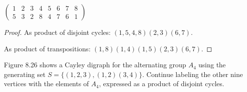 \begin{exercise}
    $\begin{pmatrix}
            1 & 2 & 3 & 4 & 5 & 6 & 7 & 8 \\
            5 & 3 & 2 & 8 & 4 & 7 & 6 & 1
        \end{pmatrix}$
\end{exercise}

\begin{proof}
    As product of disjoint cycles: $(1, 5, 4, 8)(2, 3)(6, 7)$.

    As product of transpositions: $(1, 8)(1, 4)(1, 5)(2, 3)(6, 7)$.
\end{proof}

\begin{exercise}
    Figure 8.26 shows a Cayley digraph for the alternating group $A_{4}$ using the generating set $S = \{ (1, 2, 3), (1, 2)(3, 4) \}$. Continue labeling the other nine vertices with the elements of $A_{4}$, expressed as a product of disjoint cycles.
\end{exercise}


